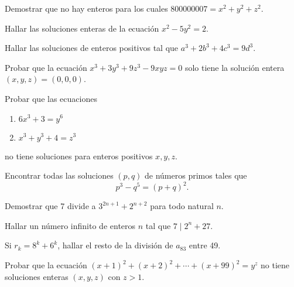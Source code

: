 \begin{exercise}
    Demostrar que no hay enteros para los cuales $800000007 = x^2 + y^2 + z^2$.
\end{exercise}

\begin{exercise}
    Hallar las soluciones enteras de la ecuación $x^2 - 5y^2 = 2$.
\end{exercise}

\begin{exercise}
    Hallar las soluciones de enteros positivos tal que $a^3 + 2b^3 + 4c^3 = 9d^3$.
\end{exercise}

\begin{exercise}
    Probar que la ecuación $x^3 + 3y^3 + 9z^3 - 9xyz = 0$ solo tiene la solución entera $(x,y,z) = (0,0,0)$.
\end{exercise}

\begin{exercise}
    Probar que las ecuaciones
    \begin{enumerate}
        \item $6x^3 + 3 = y^6$
        \item $x^3 + y^3 + 4 = z^3$
    \end{enumerate}
    no tiene soluciones para enteros positivos $x,y,z$.
\end{exercise}

\begin{exercise}
    Encontrar todas las soluciones $(p,q)$ de números primos tales que
    \[
        p^3 - q^5 = (p + q)^2.
    \]
\end{exercise}

\begin{exercise}
    Demostrar que 7 divide a $3^{2n + 1} + 2^{n + 2}$ para todo natural $n$.
\end{exercise}

\begin{exercise}
    Hallar un número infinito de enteros $n$ tal que $7 \mid 2^n + 27$.
\end{exercise}

\begin{exercise}
    Si $r_k = 8^k + 6^k$, hallar el resto de la división de $a_{83}$ entre 49.
\end{exercise}

\begin{problem}
    Probar que la ecuación $(x + 1)^2 + (x + 2)^2 + \cdots + (x + 99)^2 = y^z$ no tiene soluciones enteras $(x,y,z)$ con $z > 1$.
\end{problem}


